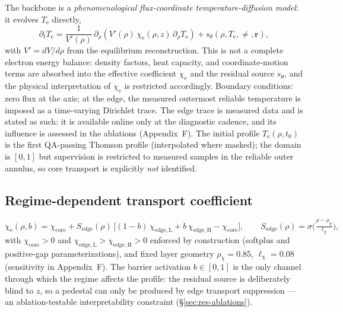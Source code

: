 \documentclass[11pt]{article}
\newcommand{\Te}{T_{\mathrm{e}}}
\newcommand{\lat}{z}
\newcommand{\inr}{\bm{r}}
\newcommand{\bact}{b}
\newcommand{\chie}{\chi_{\mathrm{e}}}
\begin{document}
The backbone is a \emph{phenomenological flux-coordinate
temperature-diffusion model}: it evolves $\Te$ directly,
\begin{equation}
\partial_t \Te
= \frac{1}{V'(\rho)}\, \partial_\rho\!\left( V'(\rho)\, \chie(\rho, \lat)\,
\partial_\rho \Te \right) + s_{\theta}(\rho, \Te, \ne, \inr),
\label{eq:pde}
\end{equation}
with $V' = dV/d\rho$ from the equilibrium reconstruction. This is not a
complete electron energy balance: density factors, heat capacity, and
coordinate-motion terms are absorbed into the effective coefficient
$\chie$ and the residual source $s_\theta$, and the physical
interpretation of $\chie$ is restricted accordingly. Boundary conditions:
zero flux at the axis; at the edge, the measured outermost reliable
temperature is imposed as a time-varying Dirichlet trace. The edge trace
is measured data and is stated as such: it is available online only at
the diagnostic cadence, and its influence is assessed in the ablations
(Appendix~F). The initial profile $\Te(\rho, t_0)$ is the first
QA-passing Thomson profile (interpolated where masked); the domain is
$[0,1]$ but supervision is restricted to measured samples in the reliable
outer annulus, so core transport is explicitly \emph{not} identified.

\subsection{Regime-dependent transport coefficient}
\label{sec:model-chi}

\begin{equation}
\chie(\rho, \bact) = \chi_{\mathrm{core}}
+ S_{\mathrm{edge}}(\rho)\,\big[(1-\bact)\,\chi_{\mathrm{edge,L}}
+ \bact\,\chi_{\mathrm{edge,H}} - \chi_{\mathrm{core}}\big],
\qquad
S_{\mathrm{edge}}(\rho) = \sigma\!\Big(\tfrac{\rho - \rho_\chi}{\ell_\chi}\Big),
\label{eq:chi}
\end{equation}
with $\chi_{\mathrm{core}} > 0$ and
$\chi_{\mathrm{edge,L}} > \chi_{\mathrm{edge,H}} > 0$ enforced by
construction (softplus and positive-gap parameterizations), and fixed
layer geometry $\rho_\chi = 0.85$, $\ell_\chi = 0.08$ (sensitivity in
Appendix~F). The barrier activation $\bact \in [0,1]$ is the only channel
through which the regime affects the profile: the residual source is
deliberately blind to $\lat$, so a pedestal can only be produced by edge
transport suppression --- an ablation-testable interpretability
constraint (\S\ref{sec:res-ablations}).
\end{document}
